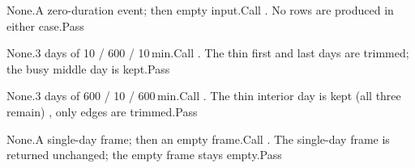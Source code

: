 {None.}{A zero-duration event; then empty input.}{Call .}
{No rows are produced in either case.}{Pass}

{None.}{3 days of 10 / 600 / 10\,min.}{Call .}
{The thin first and last days are trimmed; the busy middle day is kept.}{Pass}

{None.}{3 days of 600 / 10 / 600\,min.}{Call .}
{The thin interior day is kept (all three remain) , only edges are trimmed.}{Pass}

{None.}{A single-day frame; then an empty frame.}{Call .}
{The single-day frame is returned unchanged; the empty frame stays empty.}{Pass}
